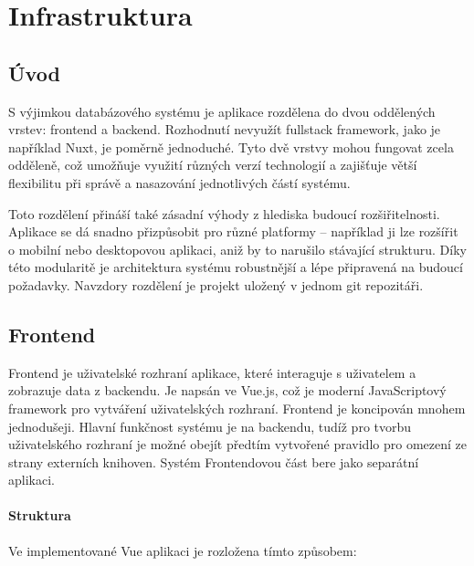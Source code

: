 \chapter{Infrastruktura}

\section{Úvod}
S výjimkou databázového systému je aplikace rozdělena do dvou oddělených vrstev: frontend a backend. Rozhodnutí nevyužít fullstack framework, jako je například Nuxt, je poměrně jednoduché. Tyto dvě vrstvy mohou fungovat zcela odděleně, což umožňuje využití různých verzí technologií a zajišťuje větší flexibilitu při správě a nasazování jednotlivých částí systému.

Toto rozdělení přináší také zásadní výhody z hlediska budoucí rozšiřitelnosti. Aplikace se dá snadno přizpůsobit pro různé platformy – například ji lze rozšířit o mobilní nebo desktopovou aplikaci, aniž by to narušilo stávající strukturu. Díky této modularitě je architektura systému robustnější a lépe připravená na budoucí požadavky. Navzdory rozdělení je projekt uložený v jednom git repozitáři.





\section{Frontend}
Frontend je uživatelské rozhraní aplikace, které interaguje s uživatelem a zobrazuje data z backendu. Je napsán ve Vue.js, což je moderní JavaScriptový framework pro vytváření uživatelských rozhraní. Frontend je koncipován mnohem jednodušeji. Hlavní funkčnost systému je na backendu, tudíž pro tvorbu uživatelského rozhraní je možné obejít předtím vytvořené pravidlo pro omezení ze strany externích knihoven. Systém Frontendovou část bere jako separátní aplikaci.

\subsubsection{Struktura}
Ve implementované Vue aplikaci je rozložena tímto způsobem:



